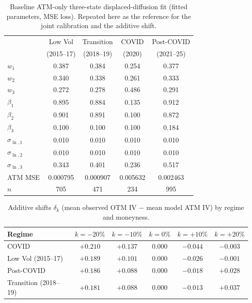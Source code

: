 \documentclass[12pt]{article}
\begin{document}
\begin{table}[htbp]
\centering
\caption{Baseline ATM-only three-state displaced-diffusion fit (fitted parameters, MSE loss). Repeated here as the reference for the joint calibration and the additive shift.}
\label{tab:params}
\small
\begin{tabular}{lcccc}
\toprule
& Low Vol & Transition & COVID & Post-COVID \\
& (2015--17) & (2018--19) & (2020) & (2021--25) \\
\midrule
$w_1$ & 0.387 & 0.384 & 0.254 & 0.377 \\
$w_2$ & 0.340 & 0.338 & 0.261 & 0.333 \\
$w_3$ & 0.272 & 0.278 & 0.486 & 0.291 \\
\midrule
$\beta_1$ & 0.895 & 0.884 & 0.135 & 0.912 \\
$\beta_2$ & 0.901 & 0.891 & 0.100 & 0.872 \\
$\beta_3$ & 0.100 & 0.100 & 0.100 & 0.184 \\
\midrule
$\sigma_{\ln,1}$ & 0.010 & 0.010 & 0.010 & 0.010 \\
$\sigma_{\ln,2}$ & 0.010 & 0.010 & 0.010 & 0.010 \\
$\sigma_{\ln,3}$ & 0.343 & 0.401 & 0.236 & 0.517 \\
\midrule
ATM MSE & 0.000795 & 0.000907 & 0.005632 & 0.002463 \\
$n$ & 705 & 471 & 234 & 995 \\
\bottomrule
\end{tabular}
\end{table}

\begin{table}[htbp]
\centering
\caption{Additive shifts $\delta_k$ (mean observed OTM IV $-$ mean model ATM IV) by regime and moneyness.}
\label{tab:shifts}
\begin{tabular}{lccccc}
\toprule
Regime & $k=-20\%$ & $k=-10\%$ & $k=0\%$ & $k=+10\%$ & $k=+20\%$ \\
\midrule
COVID & $+0.210$ & $+0.137$ & $0.000$ & $-0.044$ & $-0.003$ \\
Low Vol (2015--17) & $+0.189$ & $+0.101$ & $0.000$ & $-0.026$ & $-0.001$ \\
Post-COVID & $+0.186$ & $+0.088$ & $0.000$ & $-0.018$ & $+0.028$ \\
Transition (2018--19) & $+0.181$ & $+0.088$ & $0.000$ & $-0.013$ & $+0.037$ \\
\bottomrule
\end{tabular}
\end{table}
\end{document}
